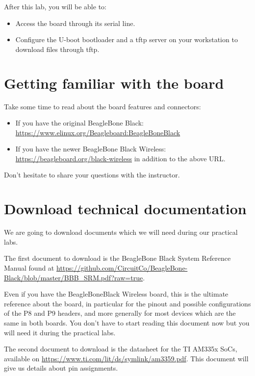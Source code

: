 
After this lab, you will be able to:
\begin{itemize}
\item Access the board through its serial line.
\item Configure the U-boot bootloader and a tftp server
      on your workstation to download files through tftp.
\end{itemize}

\section{Getting familiar with the board}

Take some time to read about the board features and connectors:

\begin{itemize}
   \item If you have the original BeagleBone Black:\\
         \url{https://www.elinux.org/Beagleboard:BeagleBoneBlack}
   \item If you have the newer BeagleBone Black Wireless:\\
	 \url{https://beagleboard.org/black-wireless} in addition to the above URL.
\end{itemize}

Don't hesitate to share your questions with the instructor.

\section{Download technical documentation}

We are going to download documents which we will need during our
practical labs.

The first document to download is the BeagleBone Black System Reference Manual found at
\url{https://github.com/CircuitCo/BeagleBone-Black/blob/master/BBB_SRM.pdf?raw=true}.

Even if you have the BeagleBoneBlack Wireless board, this is the
ultimate reference about the board, in particular for the pinout and
possible configurations of the P8 and P9 headers, and more generally
for most devices which are the same in both boards.
You don't have to start reading this document now but you will need it
during the practical labs.

The second document to download is the datasheet for the
TI AM335x SoCs, available on
\url{https://www.ti.com/lit/ds/symlink/am3359.pdf}. This document will
give us details about pin assignments.

